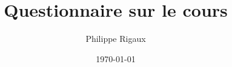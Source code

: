 \documentclass{article}
\title{Questionnaire sur le cours}
\author{Philippe Rigaux}
\date{\today}
\begin{document}
\maketitle


\begin{enumerate}

\end{enumerate}
\end{document}
